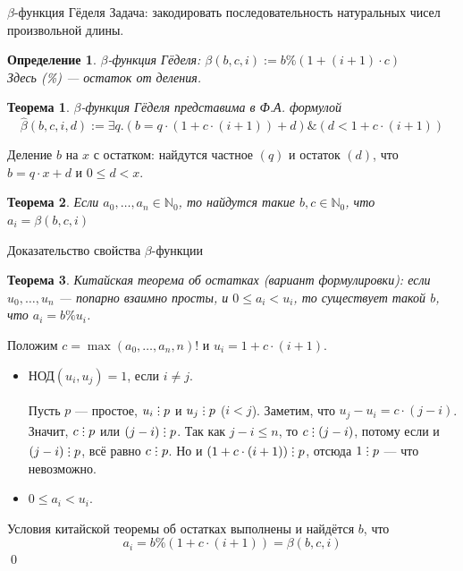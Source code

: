 \documentclass[aspectratio=169]{beamer}
\newtheorem{thm}{Теорема}[section]
\newtheorem{dfn}{Определение}[section]
\newcommand{\divisible}%
{\mathrel{\lower.2ex%
\vbox{\baselineskip=0.7ex\lineskiplimit=0pt%
\kern6pt \hbox{.}\hbox{.}\hbox{.}}%
}}
\begin{document}
\begin{frame}{$\beta$-функция Гёделя}
Задача: закодировать последовательность натуральных чисел произвольной длины.\pause
\begin{dfn}$\beta$-функция Гёделя: $\mathcal{\beta}(b,c,i) := b \% (1 + (i+1) \cdot c)$\\
Здесь (\%) --- остаток от деления.
\end{dfn}\pause
\begin{thm}$\beta$-функция Гёделя представима в Ф.А. формулой
$$\hat{\beta}(b,c,i,d) := \exists q.(b = q \cdot (1 + c \cdot (i+1)) + d) \& (d < 1 + c \cdot (i+1))$$
\end{thm}\pause\vspace{-0.3cm}
Деление $b$ на $x$ с остатком: найдутся частное $(q)$ и остаток $(d)$, что
$b = q\cdot x + d$ и $0 \le d < x$.
\pause
\begin{thm}Если $a_0, \dots, a_n \in \mathbb{N}_0$, то найдутся такие $b,c \in \mathbb{N}_0$, что
$a_i = \beta(b,c,i)$
\end{thm}
\end{frame}

\begin{frame}{Доказательство свойства $\beta$-функции}
\begin{thm}Китайская теорема об остатках (вариант формулировки): если $u_0, \dots, u_n$ --- попарно 
взаимно просты, и $0 \le a_i < u_i$, то существует такой $b$, что $a_i = b \% u_i$.
\end{thm}\pause
Положим $c = \max(a_0,\dots,a_n,n)!$ и $u_i = 1+c\cdot(i+1)$.\pause
\begin{itemize}
\item $\text{НОД}(u_i,u_j) = 1$, если $i \ne j$.\pause

Пусть $p$ --- простое, $u_i\divisible p$ и $u_j\divisible p$ ($i < j$). \pause
Заметим, что $u_j-u_i = c \cdot (j-i)$. Значит, $c\divisible p$ или $(j-i)\divisible p$. \pause
Так как $j-i \le n$, то $c \divisible (j-i)$, потому если и $(j-i)\divisible p$, всё равно $c \divisible p$. \pause
Но и $(1+c\cdot(i+1))\divisible p$, отсюда $1 \divisible p$ --- что невозможно. \pause
\item $0 \le a_i < u_i$.\pause
\end{itemize}
Условия китайской теоремы об остатках выполнены и найдётся $b$, что \vspace{-0.2cm}
$$a_i = b \% (1 + c\cdot(i+1)) = \beta(b,c,i)$$
\qed
\end{frame}
\end{document}

